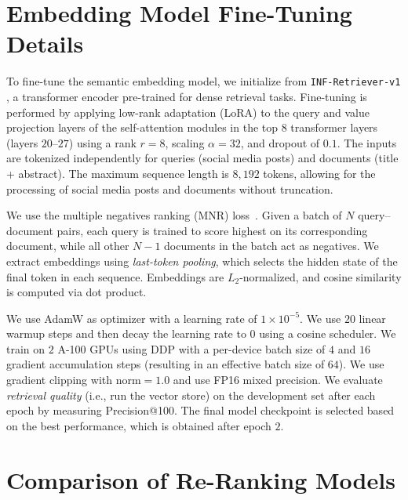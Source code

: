 \section{Embedding Model Fine-Tuning Details}\label{sec:details_embedding_ft}

To fine-tune the semantic embedding model, we initialize from \texttt{INF-Retriever-v1} \cite{infly-ai_inf-retriever-v1_nodate}, a transformer encoder pre-trained for dense retrieval tasks. Fine-tuning is performed by applying low-rank adaptation (LoRA) \cite{hu_lora_2022} to the query and value projection layers of the self-attention modules in the top $8$ transformer layers (layers $20$–$27$) using a rank $r=8$, scaling $\alpha=32$, and dropout of $0.1$.
The inputs are tokenized independently for queries (social media posts) and documents (title + abstract). The maximum sequence length is $8,192$ tokens, allowing for the processing of social media posts and documents without truncation.

We use the multiple negatives ranking (MNR) loss~\cite{henderson_efficient_2017}. Given a batch of $N$ query–document pairs, each query is trained to score highest on its corresponding document, while all other $N-1$ documents in the batch act as negatives.
We extract embeddings using \textit{last-token pooling}, which selects the hidden state of the final token in each sequence. Embeddings are $L_2$-normalized, and cosine similarity is computed via dot product.

We use AdamW \cite{loshchilov_decoupled_2019} as optimizer with a learning rate of $1 \times 10^{-5}$. We use $20$ linear warmup steps and then decay the learning rate to $0$ using a cosine scheduler. We train on $2$ A-100 GPUs using DDP with a per-device batch size of $4$ and $16$ gradient accumulation steps (resulting in an effective batch size of $64$).
We use gradient clipping with $\text{norm}=1.0$ and use FP16 mixed precision.
We evaluate \emph{retrieval quality} (i.e., run the vector store)  on the development set after each epoch by measuring Precision@100. The final model checkpoint is selected based on the best performance, which is obtained after epoch $2$.

\section{Comparison of Re-Ranking Models} \label{sec:rerankers}

